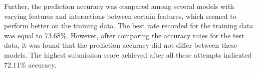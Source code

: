 Further, the prediction accuracy was compared among several models with varying features and interactions between certain features, which seemed to perform better on the training data. The best rate recorded for the training data was equal to 73.68$\%$. However, after comparing the accuracy rates for the test data, it was found that the prediction accuracy did not differ between these models. The highest submission score achieved after all these attempts indicated 72.11$\%$ accuracy.  
